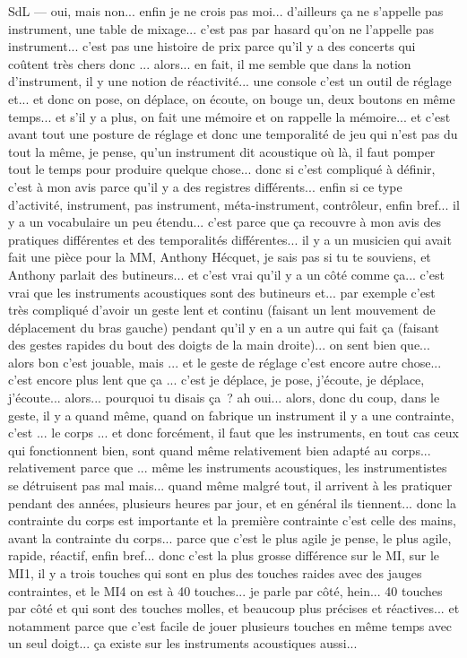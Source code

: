 SdL — oui, mais non... enfin je ne crois pas moi... d'ailleurs ça ne s'appelle pas instrument, une table de mixage... c'est pas par hasard qu'on ne l'appelle pas instrument... c'est pas une histoire de prix parce qu'il y a des concerts qui coûtent très chers donc ... alors... en fait, il me semble que dans la notion d'instrument, il y une notion de réactivité... une console c'est un outil de réglage et... et donc on pose, on déplace,  on écoute, on bouge un, deux boutons en même temps... et s'il y a plus, on fait une mémoire et on rappelle la mémoire... et c'est avant tout une posture de réglage et donc une temporalité de jeu qui n'est pas du tout la même, je pense, qu'un instrument dit acoustique où là, il faut pomper tout le temps pour produire quelque chose... donc si c'est compliqué à définir, c'est à mon avis parce qu'il y a des registres différents... enfin si ce type d'activité, instrument, pas instrument, méta-instrument, contrôleur, enfin bref... il y a un vocabulaire un peu étendu... c'est parce que ça recouvre à mon avis des pratiques différentes et des temporalités différentes... il y a un musicien qui avait fait une pièce pour la MM, Anthony Hécquet, je sais pas si tu te souviens, et Anthony parlait des butineurs... et c'est vrai qu'il y a un côté comme ça... c'est vrai que les instruments acoustiques sont des butineurs et... par exemple c'est très compliqué d'avoir un geste lent et continu (faisant un lent mouvement de déplacement du bras gauche) pendant qu'il y en a un autre qui fait ça (faisant des gestes rapides du bout des doigts de la main droite)... on sent bien que... alors bon c'est jouable, mais ... et le geste de réglage c'est encore autre chose... c'est encore plus lent que ça ... c'est je déplace, je pose, j'écoute, je déplace, j'écoute... alors... pourquoi tu disais ça ? ah oui... alors, donc du coup, dans le geste, il y a quand même, quand on fabrique un instrument il y a une contrainte, c'est ... le corps ... et donc forcément, il faut que les instruments, en tout cas ceux qui fonctionnent bien, sont quand même relativement bien adapté au corps... relativement parce que ... même les instruments acoustiques, les instrumentistes se détruisent pas mal mais... quand même malgré tout, il arrivent à les pratiquer pendant des années, plusieurs heures par jour, et en général ils tiennent... donc la contrainte du corps est importante et la première contrainte c'est celle des mains, avant la contrainte du corps... parce que c'est le plus agile je pense, le plus agile, rapide, réactif, enfin bref... donc c'est la plus grosse différence sur le MI, sur le MI1, il y a trois touches qui sont en plus des touches raides avec des jauges contraintes, et le MI4 on est à 40 touches... je parle par côté, hein... 40 touches par côté et qui sont des touches molles, et beaucoup plus précises et réactives... et notamment parce que c'est facile de jouer plusieurs touches en même temps avec un seul doigt... ça existe sur les instruments acoustiques aussi... 

